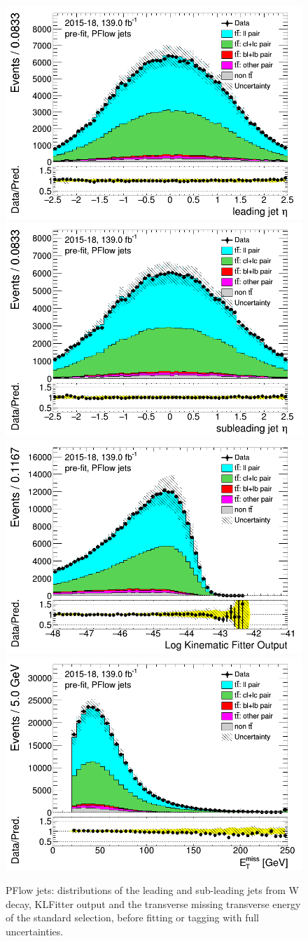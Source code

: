 \documentclass[letterpaper,12pt]{article}
\begin{document}
\label{sec:appendix_standard_selection}
\newpage	
\begin{figure}[H]
\includegraphics[width=.45\textwidth]{FTAG_plots/pretagNoRwwithouthighpTPFlowall/DataMC_h_J0_eta.png}
\includegraphics[width=.45\textwidth]{FTAG_plots/pretagNoRwwithouthighpTPFlowall/DataMC_h_J1_eta.png}\\
\includegraphics[width=.45\textwidth]{FTAG_plots/pretagNoRwwithouthighpTPFlowall/DataMC_h_LLR.png}
\includegraphics[width=.45\textwidth]{FTAG_plots/pretagNoRwwithouthighpTPFlowall/DataMC_h_MET.png}\\

\caption{PFlow jets: distributions of the leading and sub-leading jets 
from W decay, KLFitter output and the transverse missing transverse 
energy of the standard selection, before fitting or tagging with 
full uncertainties.} \label{fig:standard_jets_VRJets}
\end{figure}
\end{document}
